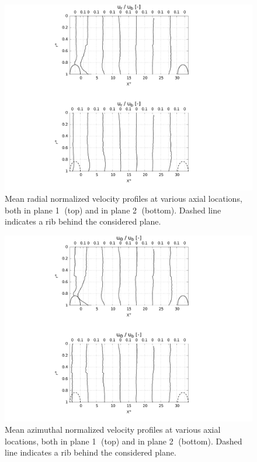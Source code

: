 \begin{figure}[!ht]
\centering
\includegraphics[width=0.7\linewidth,keepaspectratio]{fig/applications/optim/Radial_vel.pdf}
\caption{Mean radial normalized velocity profiles at various axial locations, both in plane \textcircled{1} (top) and in plane \textcircled{2} (bottom). Dashed line indicates a rib behind the considered plane.}
\label{Ur_mean}
\end{figure}

\begin{figure}[h!]
\centering
\includegraphics[width=0.7\linewidth,keepaspectratio]{fig/applications/optim/Azimuthal_vel.pdf}
\caption{Mean azimuthal normalized velocity profiles at various axial locations, both in plane \textcircled{1} (top) and in plane \textcircled{2} (bottom). Dashed line indicates a rib behind the considered plane.}
\label{Uw_mean}
\end{figure}

